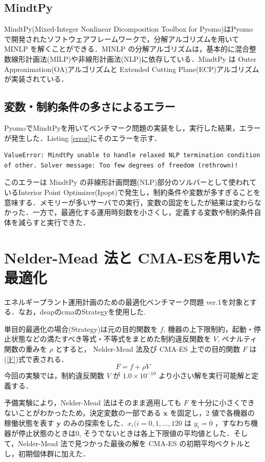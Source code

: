 \documentclass[twocolumn]{jarticle}
\begin{document}
    \subsection{MindtPy}
    MindtPy(Mixed-Integer Nonlinear Dicomposition Toolbox for Pyomo)\cite{BERNAL2018895}はPyomo で開発されたソフトウェアフレームワークで，分解アルゴリズムを用いて MINLP を解くことができる．MINLP の分解アルゴリズムは，基本的に混合整数線形計画法(MILP)や非線形計画法(NLP)に依存している．MindtPy は Outer Approximation(OA)アルゴリズム\cite{OA}と Extended Cutting Plane(ECP)アルゴリズムが実装されている．

    \subsection{変数・制約条件の多さによるエラー}
    PyomoでMindtPyを用いてベンチマーク問題の実装をし，実行した結果，エラーが発生した．Listing \ref{error}にそのエラーを示す．
    \begin{lstlisting}[caption = 発生したエラー, label = error]
        ValueError: MindtPy unable to handle relaxed NLP termination condition of other. Solver message: Too few degrees of freedom (rethrown)!
    \end{lstlisting}
   このエラーは MindtPy の非線形計画問題(NLP)部分のソルバーとして使われているInterior Point Optimizer(Ipopt)で発生し，制約条件や変数が多すぎることを意味する．メモリーが多いサーバでの実行，変数の固定をしたが結果は変わらなかった．一方で，最適化する運用時刻数を小さくし，定義する変数や制約条件自体を減らすと実行できた．
  
\section{Nelder-Mead 法と CMA-ESを用いた最適化}
エネルギープラント運用計画のための最適化ベンチマーク問題 ver.1\cite{denki}を対象とする．なお，deapのcmaのStrategyを使用した\cite{DEAP_JMLR2012}.

単目的最適化の場合(Strategy)は元の目的関数を $f$, 機器の上下限制約，起動・停止状態などの満たすべき等式・不等式をまとめた制約違反関数を $V$, ペナルティ関数の重みを $\rho$ とすると， Nelder-Mead 法及び CMA-ES 上での目的関数 $F$ は(\ref{F})式で表される．
\begin{equation}
    \label{F}
    F = f + \rho V
\end{equation}
今回の実験では，制約違反関数 $V$ が $1.0 \times 10^{-10}$ より小さい解を実行可能解と定義する．

予備実験により，Nelder-Mead 法はそのまま適用しても $F$ を十分に小さくできないことがわかったため，決定変数の一部である $\bm{x}$ を固定し，2 値で各機器の稼働状態を表す $\bm{y}$ のみの探索をした．$x_i(i=0,1,\dots,120$ は $y_i=0$ ，すなわち機器が停止状態のときは0, そうでないときは各上下限値の平均値とした．そして，Nelder-Mead 法で見つかった最後の解を CMA-ES の初期平均ベクトルとし，初期個体群に加えた．
\end{document}
